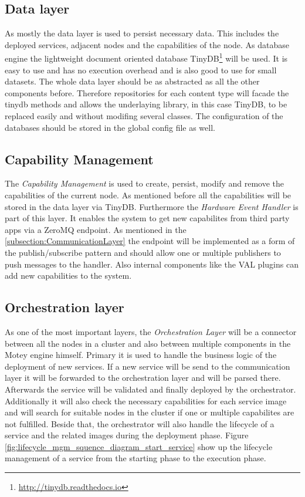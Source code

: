 \subsection{Data layer}
As mostly the data layer is used to persist necessary data.
This includes the deployed services, adjacent nodes and the capabilities of the node.
As database engine the lightweight document oriented database TinyDB\footnote{\url{http://tinydb.readthedocs.io}} will be used.
It is easy to use and has no execution overhead and is also good to use for small datasets.
The whole data layer should be as abstracted as all the other components before.
Therefore repositories for each content type will facade the tinydb methods and allows the underlaying library, in this case TinyDB, to be replaced easily and
without modifing several classes.
The configuration of the databases should be stored in the global config file as well.


\subsection{Capability Management}
The \textit{Capability Management} is used to create, persist, modify and remove the capabilities of the current node.
As mentioned before all the capabilities will be stored in the data layer via TinyDB.
Furthermore the \textit{Hardware Event Handler} is part of this layer.
It enables the system to get new capabilites from third party apps via a ZeroMQ endpoint.
As mentioned in the \ref{subsection:CommunicationLayer} the endpoint will be implemented as a form of the publish/subscribe pattern and should allow one or multiple publishers to push messages to the handler.
Also internal components like the \ac{VAL} plugins can add new capabilities to the system.


\subsection{Orchestration layer}
As one of the most important layers, the \textit{Orchestration Layer} will be a connector between all the nodes in a cluster and also between multiple components in the Motey engine himself.
Primary it is used to handle the business logic of the deployment of new services.
If a new service will be send to the communication layer it will be forwarded to the orchestration layer and will be parsed there.
Afterwards the service will be validated and finally deployed by the orchestrator.
Additionally it will also check the necessary capabilities for each service image and will search for suitable nodes in the cluster if one or multiple capabilites are not fulfilled.
Beside that, the orchestrator will also handle the lifecycle of a service and the related images during the deployment phase.
Figure \ref{fig:lifecycle_mgm_squence_diagram_start_service} show up the lifecycle management of a service from the starting phase to the execution phase.

